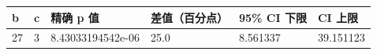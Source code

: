\begin{tabular}{llllll}
\toprule
b & c & 精确 p 值 & 差值（百分点） & 95\% CI 下限 & CI 上限 \\
\midrule
27 & 3 & 8.43033194542e-06 & 25.0 & 8.561337 & 39.151123 \\
\bottomrule
\end{tabular}
